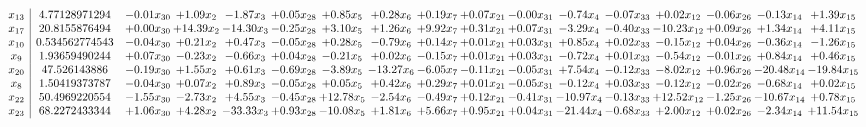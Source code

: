 \documentclass[9pt]{article}
\begin{document}
\[\begin{array}{c| c c@{\hskip 2pt} c@{\hskip 2pt} c@{\hskip 2pt} c@{\hskip 2pt} c@{\hskip 2pt} c@{\hskip 2pt} c@{\hskip 2pt} c@{\hskip 2pt} c@{\hskip 2pt} c@{\hskip 2pt} c@{\hskip 2pt} c@{\hskip 2pt} c@{\hskip 2pt} c@{\hskip 2pt} c@{\hskip 2pt} }
 x_{13}   &  4.77128971294 & -0.01 x_{30} & +  1.09 x_{2} & -1.87 x_{3} & +  0.05 x_{28} & +  0.85 x_{5} & +  0.28 x_{6} & +  0.19 x_{7} & +  0.07 x_{21} & -0.00 x_{31} & -0.74 x_{4} & -0.07 x_{33} & +  0.02 x_{12} & -0.06 x_{26} & -0.13 x_{14} & +  1.39 x_{15}\\
 x_{17}   &  20.8155876494 & +  0.00 x_{30} & + 14.39 x_{2} & -14.30 x_{3} & -0.25 x_{28} & +  3.10 x_{5} & +  1.26 x_{6} & +  9.92 x_{7} & +  0.31 x_{21} & +  0.07 x_{31} & -3.29 x_{4} & -0.40 x_{33} & -10.23 x_{12} & +  0.09 x_{26} & +  1.34 x_{14} & +  4.11 x_{15}\\
 x_{10}   &  0.534562774543 & -0.04 x_{30} & +  0.21 x_{2} & +  0.47 x_{3} & -0.05 x_{28} & +  0.28 x_{5} & -0.79 x_{6} & +  0.14 x_{7} & +  0.01 x_{21} & +  0.03 x_{31} & +  0.85 x_{4} & +  0.02 x_{33} & -0.15 x_{12} & +  0.04 x_{26} & -0.36 x_{14} & -1.26 x_{15}\\
 x_{9}   &  1.93659490244 & +  0.07 x_{30} & -0.23 x_{2} & -0.66 x_{3} & +  0.04 x_{28} & -0.21 x_{5} & +  0.02 x_{6} & -0.15 x_{7} & +  0.01 x_{21} & +  0.03 x_{31} & -0.72 x_{4} & +  0.01 x_{33} & -0.54 x_{12} & -0.01 x_{26} & +  0.84 x_{14} & +  0.46 x_{15}\\
 x_{20}   &  47.526143886 & -0.19 x_{30} & +  1.55 x_{2} & +  0.61 x_{3} & -0.69 x_{28} & -3.89 x_{5} & -13.27 x_{6} & -6.05 x_{7} & -0.11 x_{21} & -0.05 x_{31} & +  7.54 x_{4} & -0.12 x_{33} & -8.02 x_{12} & +  0.96 x_{26} & -20.48 x_{14} & -19.84 x_{15}\\
 x_{8}   &  1.50419373787 & -0.04 x_{30} & +  0.07 x_{2} & +  0.89 x_{3} & -0.05 x_{28} & +  0.05 x_{5} & +  0.42 x_{6} & +  0.29 x_{7} & +  0.01 x_{21} & -0.05 x_{31} & -0.12 x_{4} & +  0.03 x_{33} & -0.12 x_{12} & -0.02 x_{26} & -0.68 x_{14} & +  0.02 x_{15}\\
 x_{22}   &  50.4969220554 & -1.55 x_{30} & -2.73 x_{2} & +  4.55 x_{3} & -0.45 x_{28} & + 12.78 x_{5} & -2.54 x_{6} & -0.49 x_{7} & +  0.12 x_{21} & -0.41 x_{31} & -10.97 x_{4} & -0.13 x_{33} & + 12.52 x_{12} & -1.25 x_{26} & -10.67 x_{14} & +  0.78 x_{15}\\
 x_{23}   &  68.2272433344 & +  1.06 x_{30} & +  4.28 x_{2} & -33.33 x_{3} & +  0.93 x_{28} & -10.08 x_{5} & +  1.81 x_{6} & +  5.66 x_{7} & +  0.95 x_{21} & +  0.04 x_{31} & -21.44 x_{4} & -0.68 x_{33} & +  2.00 x_{12} & +  0.02 x_{26} & -2.34 x_{14} & + 11.54 x_{15}\\

\end{array}\]
\end{document}
